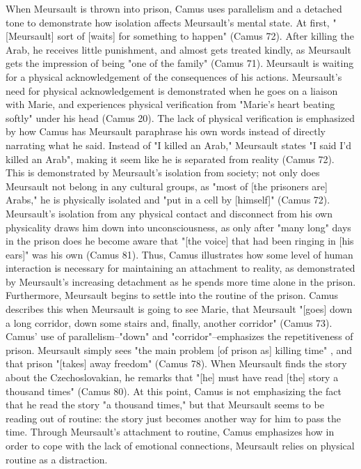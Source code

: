 \documentclass[12pt]{article}
\begin{document}
    When Meursault is thrown into prison,
    Camus uses parallelism and a detached tone to demonstrate how isolation
    affects Meursault's mental state. At first, "[Meursault] sort of [waits]
    for something to happen" (Camus 72). After killing the Arab, he receives
    little punishment, and almost gets treated kindly, as Meursault gets the
    impression of being "one of the family" (Camus 71). Meursault is waiting
    for a physical acknowledgement of the consequences of his actions.
    Meursault's need for physical acknowledgement is
    demonstrated when he goes on a liaison with Marie, and experiences
    physical verification from "Marie's heart beating softly" under his
    head (Camus 20). The lack of physical verification is emphasized by how
    Camus has Meursault paraphrase his own words instead of directly
    narrating what he said. Instead of "I killed an Arab," Meursault states
    "I said I'd killed an Arab", making it seem like he is
    separated from reality (Camus 72). This is demonstrated by Meursault's isolation
    from society; not only does Meursault not belong in any cultural groups,
    as "most of [the prisoners are] Arabs," he is physically isolated and
    "put in a cell by [himself]" (Camus 72). Meursault's isolation from any
    physical contact and disconnect from his own physicality draws him down
    into unconsciousness, as only after "many long" days in the prison does
    he become aware that "[the voice] that had been ringing in [his ears]"
    was his own (Camus 81). Thus, Camus illustrates how some level of human
    interaction is necessary for maintaining an attachment to reality, as
    demonstrated by Meursault's increasing detachment as he spends more time
    alone in the prison. Furthermore, Meursault begins to settle into the
    routine of the prison. Camus describes this when Meursault is going to
    see Marie, that Meursault "[goes] down a long corridor, down some stairs
    and, finally, another corridor" (Camus 73). Camus' use of
    parallelism--"down" and "corridor"--emphasizes the repetitiveness of
    prison. Meursault simply sees "the main problem [of prison as] killing
    time" , and that prison "[takes] away freedom" (Camus 78). When
    Meursault finds the story about the Czechoslovakian, he remarks that
    "[he] must have read [the] story a thousand times" (Camus 80). At this
    point, Camus is not emphasizing the fact that he read the story "a
    thousand times," but that Meursault seems to be reading out of routine:
    the story just becomes another way for him to pass the time. Through
    Meursault's attachment to routine, Camus emphasizes how in order to cope
    with the lack of emotional connections, Meursault relies on physical
    routine as a distraction. \\
\end{document}
